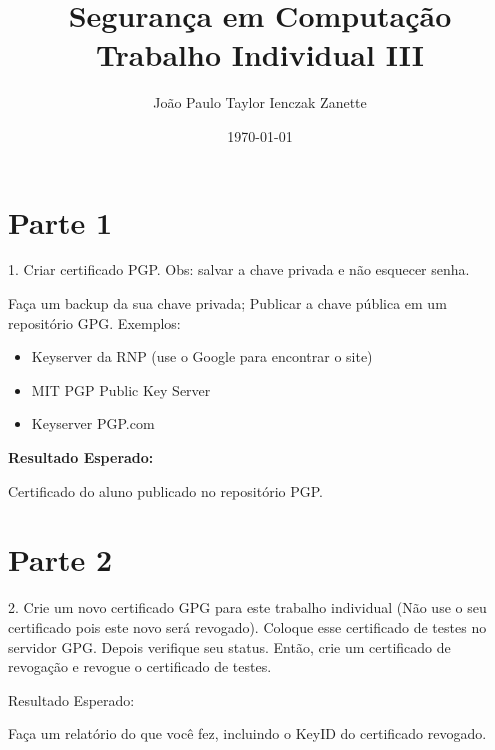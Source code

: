 \documentclass{article}
\title{%
    Segurança em Computação \\
    Trabalho Individual III
}
\author{João Paulo Taylor Ienczak Zanette}
\date{\today}
\newcommand{\done}{%
    \rlap{$\square$}{%
        \raisebox{2pt}{\large\hspace{1pt}\ding{51}
    }}\hspace{-2.5pt}
}
\begin{document}
    \maketitle{}

    \section{Parte 1}

    \begin{superframe}
        1. Criar certificado PGP\@.
        Obs: salvar a chave privada e não esquecer senha.


        Faça um backup da sua chave privada;
        Publicar a chave pública em um repositório GPG\@. Exemplos:
        \begin{itemize}
            \item Keyserver da RNP (use o Google para encontrar o site)
            \item MIT PGP Public Key Server
            \item Keyserver PGP.com
        \end{itemize}

        \textbf{Resultado Esperado:}

        \begin{todolist}
            \item[\done] Certificado do aluno publicado no repositório PGP\@.
        \end{todolist}
    \end{superframe}

    \section{Parte 2}

    \begin{superframe}
        2. Crie um novo certificado GPG para este trabalho individual (Não use
        o seu certificado pois este novo será revogado). Coloque esse
        certificado de testes no servidor GPG\@. Depois verifique seu status.
        Então, crie um certificado de revogação e revogue o certificado de
        testes.

        Resultado Esperado:

        \begin{todolist}
            \item[\done] Faça um relatório do que você fez, incluindo o KeyID
                do certificado revogado.
        \end{todolist}
    \end{superframe}
\end{document}
